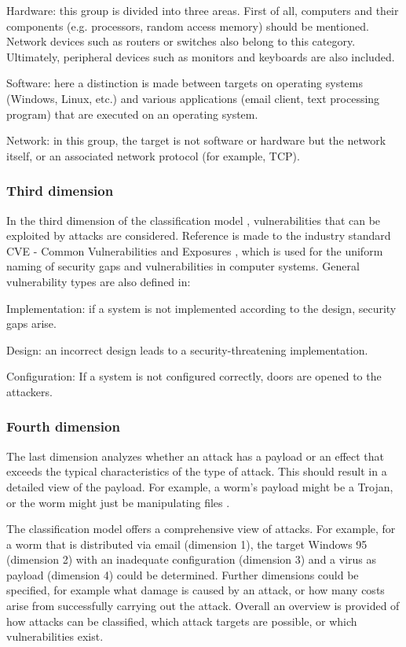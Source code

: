\documentclass[conference]{IEEEtran}
\begin{document}
\smallskip Hardware: this group is divided into three areas. First of all, computers and their components (e.g. processors, random access memory) should be mentioned. Network devices such as routers or switches also belong to this category. Ultimately, peripheral devices such as monitors and keyboards are also included.

\smallskip Software: here a distinction is made between targets on operating systems (Windows, Linux, etc.) and various applications (email client, text processing program) that are executed on an operating system.

\smallskip Network: in this group, the target is not software or hardware but the network itself, or an associated network protocol (for example, TCP).

\medskip \subsubsection{Third dimension}In the third dimension of the classification model \cite{b5}, vulnerabilities that can be exploited by attacks are considered. Reference is made to the industry standard CVE - Common Vulnerabilities and Exposures \cite{b7}, which is used for the uniform naming of security gaps and vulnerabilities in computer systems. General vulnerability types are also defined in\cite{b8}:

\smallskip Implementation: if a system is not implemented according to the design, security gaps arise.

\smallskip Design: an incorrect design leads to a security-threatening implementation.

\smallskip Configuration: If a system is not configured correctly, doors are opened to the attackers.

\medskip \subsubsection{Fourth dimension}The last dimension analyzes whether an attack has a payload or an effect that exceeds the typical characteristics of the type of attack. This should result in a detailed view of the payload. For example, a worm's payload might be a Trojan, or the worm might just be manipulating files \cite{b5}.

\medskip The classification model offers a comprehensive view of attacks. For example, for a worm that is distributed via email (dimension 1), the target Windows 95 (dimension 2) with an inadequate configuration (dimension 3) and a virus as payload (dimension 4) could be determined. Further dimensions could be specified, for example what damage is caused by an attack, or how many costs arise from successfully carrying out the attack. Overall an overview is provided of how attacks can be classified, which attack targets are possible, or which vulnerabilities exist.
\end{document}
